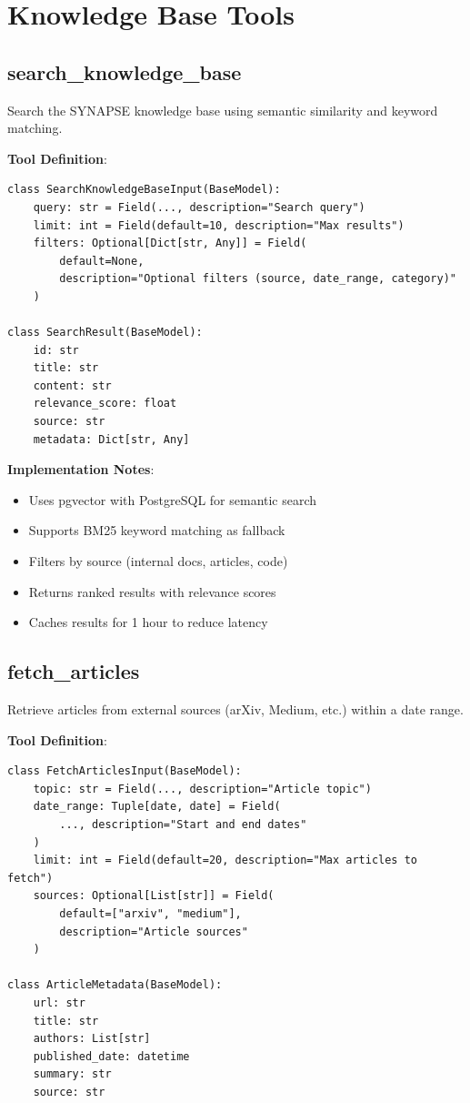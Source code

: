 \documentclass{report}
\begin{document}
\section{Knowledge Base Tools}

\subsection{search\_knowledge\_base}

Search the SYNAPSE knowledge base using semantic similarity and keyword matching.

\textbf{Tool Definition}:
\begin{lstlisting}
class SearchKnowledgeBaseInput(BaseModel):
    query: str = Field(..., description="Search query")
    limit: int = Field(default=10, description="Max results")
    filters: Optional[Dict[str, Any]] = Field(
        default=None,
        description="Optional filters (source, date_range, category)"
    )

class SearchResult(BaseModel):
    id: str
    title: str
    content: str
    relevance_score: float
    source: str
    metadata: Dict[str, Any]
\end{lstlisting}

\textbf{Implementation Notes}:
\begin{itemize}
    \item Uses pgvector with PostgreSQL for semantic search
    \item Supports BM25 keyword matching as fallback
    \item Filters by source (internal docs, articles, code)
    \item Returns ranked results with relevance scores
    \item Caches results for 1 hour to reduce latency
\end{itemize}

\subsection{fetch\_articles}

Retrieve articles from external sources (arXiv, Medium, etc.) within a date range.

\textbf{Tool Definition}:
\begin{lstlisting}
class FetchArticlesInput(BaseModel):
    topic: str = Field(..., description="Article topic")
    date_range: Tuple[date, date] = Field(
        ..., description="Start and end dates"
    )
    limit: int = Field(default=20, description="Max articles to fetch")
    sources: Optional[List[str]] = Field(
        default=["arxiv", "medium"],
        description="Article sources"
    )

class ArticleMetadata(BaseModel):
    url: str
    title: str
    authors: List[str]
    published_date: datetime
    summary: str
    source: str
\end{lstlisting}
\end{document}
